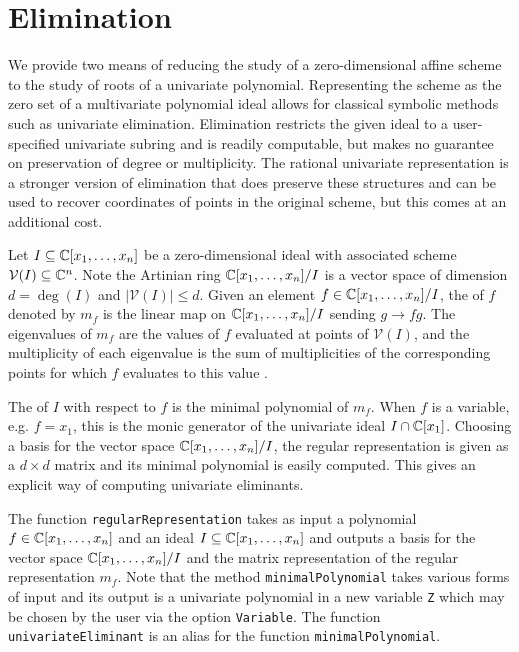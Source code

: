 


\section{Elimination}

We provide two means of reducing the study of a zero-dimensional affine scheme to the study of roots of a univariate polynomial. Representing the scheme as the zero set of a multivariate polynomial ideal allows for classical symbolic methods such as univariate elimination. Elimination restricts the given ideal to a user-specified univariate subring and is readily computable, but makes no guarantee on preservation of degree or multiplicity. The rational univariate representation is a stronger version of elimination that does preserve these structures and can be used to recover coordinates of points in the original scheme, but this comes at an additional cost.

Let $I\subseteq\mathbb{C}[x_1,\dotsc,x_n]$  be a zero-dimensional ideal with associated scheme $\mathcal{V}(I)\subseteq\mathbb{C}^n$. Note the Artinian ring $\mathbb{C}[x_1,\dotsc,x_n]/I$ is a vector space of dimension $d = \deg(I)$ and $|\mathcal{V}(I)|\le d$. Given an element $f\in\mathbb{C}[x_1,\dotsc,x_n]/I$, the  of $f$ denoted by $m_f$ is the linear map on $\mathbb{C}[x_1,\dotsc,x_n]/I$ sending $g\to fg$.  The eigenvalues of $m_f$ are the values of $f$ evaluated at points of $\mathcal{V}(I)$, and the multiplicity of each eigenvalue is the sum of multiplicities of the corresponding points for which $f$ evaluates to this value .

The  of $I$ with respect to $f$ is the minimal polynomial of $m_f$. When $f$ is a variable, e.g. $f=x_1$, this is the monic generator of the univariate ideal $I\cap\mathbb{C}[x_1]$. Choosing a basis for the vector space $\mathbb{C}[x_1,\dotsc,x_n]/I$, the regular representation is given as a $d\times d$ matrix and its minimal polynomial is easily computed. This gives an explicit way of computing univariate eliminants.

The function \texttt{regularRepresentation} takes as input a polynomial $f\in\mathbb{C}[x_1,\dotsc,x_n]$ and an ideal $I\subseteq\mathbb{C}[x_1,\dotsc,x_n]$ and outputs a basis for the vector space $\mathbb{C}[x_1,\dotsc,x_n]/I$ and the matrix representation of the regular representation $m_f$. Note that the method \texttt{minimalPolynomial} takes various forms of input and its output is a univariate polynomial in a new variable \texttt{Z} which may be chosen by the user via the option \texttt{Variable}. The function \texttt{univariateEliminant} is an alias for the function \texttt{minimalPolynomial}. 

